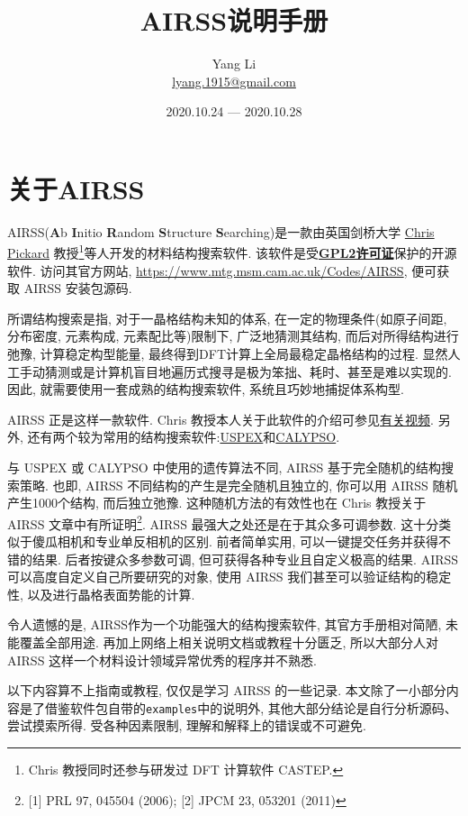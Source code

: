 \documentclass[a4paper, 10pt]{article}
\title{\textbf{AIRSS说明手册}}
\author{Yang Li\\ \href{mailto:lyang.1915@gmail.com}{lyang.1915@gmail.com}}
\date{2020.10.24 --- 2020.10.28}
\begin{document}
\maketitle
\tableofcontents

\newpage
\section{关于AIRSS}
AIRSS(\textbf{A}b \textbf{I}nitio \textbf{R}andom \textbf{S}tructure \textbf{S}earching)是一款由英国剑桥大学 \href{https://www.mtg.msm.cam.ac.uk/People/CJP}{Chris Pickard} 教授\footnote{Chris 教授同时还参与研发过 DFT 计算软件 CASTEP.}等人开发的材料结构搜索软件. 该软件是受\href{https://en.wikipedia.org/wiki/GNU_General_Public_License}{\textbf{GPL2许可证}}保护的开源软件. 访问其官方网站, \url{https://www.mtg.msm.cam.ac.uk/Codes/AIRSS}, 便可获取 AIRSS 安装包源码. 
  
所谓结构搜索是指, 对于一晶格结构未知的体系, 在一定的物理条件(如原子间距, 分布密度, 元素构成, 元素配比等)限制下, 广泛地猜测其结构, 而后对所得结构进行弛豫, 计算稳定构型能量, 最终得到DFT计算上全局最稳定晶格结构的过程. 显然人工手动猜测或是计算机盲目地遍历式搜寻是极为笨拙、耗时、甚至是难以实现的. 因此, 就需要使用一套成熟的结构搜索软件, 系统且巧妙地捕捉体系构型.
    
AIRSS 正是这样一款软件. Chris 教授本人关于此软件的介绍可参见\href{https://www.youtube.com/watch?v=xW6pOYEIKVs&t=1061s}{有关视频}. 另外, 还有两个较为常用的结构搜索软件:\href{http://uspex.stonybrook.edu/uspex.html}{USPEX}和\href{http://www.calypso.cn}{CALYPSO}.

与 USPEX 或 CALYPSO 中使用的遗传算法不同, AIRSS 基于完全随机的结构搜索策略. 也即, AIRSS 不同结构的产生是完全随机且独立的, 你可以用 AIRSS 随机产生1000个结构, 而后独立弛豫. 这种随机方法的有效性也在 Chris 教授关于 AIRSS 文章中有所证明\footnote{ [1] PRL 97, 045504 (2006); [2] JPCM 23, 053201 (2011)}. AIRSS 最强大之处还是在于其众多可调参数. 这十分类似于傻瓜相机和专业单反相机的区别. 前者简单实用, 可以一键提交任务并获得不错的结果. 后者按键众多参数可调, 但可获得各种专业且自定义极高的结果. AIRSS 可以高度自定义自己所要研究的对象, 使用 AIRSS 我们甚至可以验证结构的稳定性, 以及进行晶格表面势能的计算.

令人遗憾的是, AIRSS作为一个功能强大的结构搜索软件, 其官方手册相对简陋, 未能覆盖全部用途. 再加上网络上相关说明文档或教程十分匮乏, 所以大部分人对 AIRSS 这样一个材料设计领域异常优秀的程序并不熟悉. 

以下内容算不上指南或教程, 仅仅是学习 AIRSS 的一些记录. 本文除了一小部分内容是了借鉴软件包自带的\verb|examples|中的说明外, 其他大部分结论是自行分析源码、尝试摸索所得. 受各种因素限制, 理解和解释上的错误或不可避免.
\end{document}
